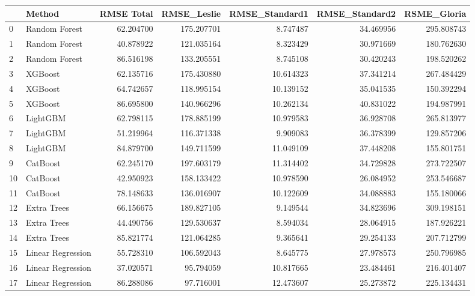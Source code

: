 \begin{tabular}{llrrrrr}
\toprule
{} &             Method &  RMSE Total &  RMSE\_Leslie &  RMSE\_Standard1 &  RMSE\_Standard2 &  RSME\_Gloria \\
\midrule
0  &      Random Forest &   62.204700 &   175.207701 &        8.747487 &       34.469956 &   295.808743 \\
1  &      Random Forest &   40.878922 &   121.035164 &        8.323429 &       30.971669 &   180.762630 \\
2  &      Random Forest &   86.516198 &   133.205551 &        8.745108 &       30.420243 &   198.520262 \\
3  &            XGBoost &   62.135716 &   175.430880 &       10.614323 &       37.341214 &   267.484429 \\
4  &            XGBoost &   64.742657 &   118.995154 &       10.139152 &       35.041535 &   150.392294 \\
5  &            XGBoost &   86.695800 &   140.966296 &       10.262134 &       40.831022 &   194.987991 \\
6  &           LightGBM &   62.798115 &   178.885199 &       10.979583 &       36.928708 &   265.813977 \\
7  &           LightGBM &   51.219964 &   116.371338 &        9.909083 &       36.378399 &   129.857206 \\
8  &           LightGBM &   84.879700 &   149.711599 &       11.049109 &       37.448208 &   155.801751 \\
9  &           CatBoost &   62.245170 &   197.603179 &       11.314402 &       34.729828 &   273.722507 \\
10 &           CatBoost &   42.950923 &   158.133422 &       10.978590 &       26.084952 &   253.546687 \\
11 &           CatBoost &   78.148633 &   136.016907 &       10.122609 &       34.088883 &   155.180066 \\
12 &        Extra Trees &   66.156675 &   189.827105 &        9.149544 &       34.823696 &   309.198151 \\
13 &        Extra Trees &   44.490756 &   129.530637 &        8.594034 &       28.064915 &   187.926221 \\
14 &        Extra Trees &   85.821774 &   121.064285 &        9.365641 &       29.254133 &   207.712799 \\
15 &  Linear Regression &   55.728310 &   106.592043 &        8.645775 &       27.978573 &   250.796985 \\
16 &  Linear Regression &   37.020571 &    95.794059 &       10.817665 &       23.484461 &   216.401407 \\
17 &  Linear Regression &   86.288086 &    97.716001 &       12.473607 &       25.273872 &   225.134431 \\
\bottomrule
\end{tabular}
